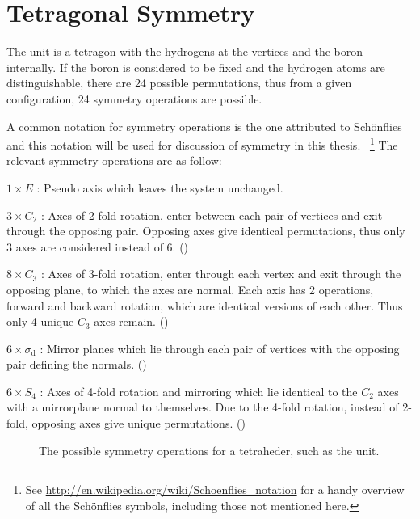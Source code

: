 \section{Tetragonal Symmetry}
\label{sec:symmetry}

The  unit is a tetragon with the hydrogens at the vertices and the boron internally.
If the boron is considered to be fixed and the hydrogen atoms are distinguishable, there are 24 possible permutations, thus from a given configuration, 24 symmetry operations are possible.

A common notation for symmetry operations is the one attributed to Sch\"onflies~\cite{schonflies-notation-1889} and this notation will be used for discussion of symmetry in this thesis.
~\footnote{See \url{http://en.wikipedia.org/wiki/Schoenflies_notation} for a handy overview of all the Sch\"onflies symbols, including those not mentioned here.}
The relevant symmetry operations are as follow:
\bit
\item $1 \times E$ : Pseudo axis which leaves the system unchanged.
\item $3 \times C_2$ : Axes of 2-fold rotation, enter between each pair of vertices and exit through the opposing pair.
Opposing axes give identical permutations, thus only 3 axes are considered instead of 6.
()
\item $8 \times C_3$ : Axes of 3-fold rotation, enter through each vertex and exit through the opposing plane, to which the axes are normal. Each axis has 2 operations, forward and backward rotation, which are identical versions of each other.
Thus only 4 unique $C_3$ axes remain.
()
\item $6 \times \sigma_\text{d}$ : Mirror planes which lie through each pair of vertices with the opposing pair defining the normals.
()
\item $6 \times S_4$ : Axes of 4-fold rotation and mirroring which lie identical to the $C_2$ axes with a mirrorplane normal to themselves. Due to the 4-fold rotation, instead of 2-fold, opposing axes give unique permutations.
()
\eit

\begin{figure}[ph]
  \begin{center}
\newline
    \parbox{0.85\linewidth}{
      \caption{The possible symmetry operations for a tetraheder, such as the  unit.
      }
      \label{fig:symmetry}
    }
  \end{center}
\end{figure}

